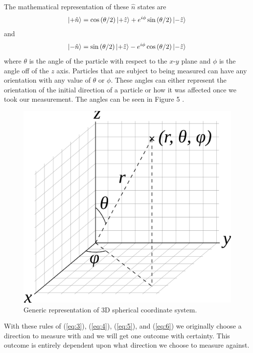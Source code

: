 \documentclass[twocolumn]{article}
\begin{document}
The mathematical representation of these $\hat{n}$ states are 
\begin{equation} \label{eq:5}
\ket{+\hat{n}}=\cos{(\theta/2)}\ket{+\hat{z}}+e^{i\phi}\sin{(\theta/2)}\ket{-\hat{z}}
\end{equation}
and
\begin{equation} \label{eq:6}
\ket{-\hat{n}}=\sin{(\theta/2)}\ket{+\hat{z}}-e^{i\phi}\cos{(\theta/2)}\ket{-\hat{z}}
\end{equation}
where $\theta$ is the angle of the particle with respect to the $x$-$y$ plane and $\phi$ is the angle off of the $z$ axis. Particles that are subject to being measured can have any orientation with any value of $\theta$ or $\phi$. These angles can either represent the orientation of the initial direction of a particle or how it was affected once we took our measurement. The angles can be seen in Figure 5 \cite{Hazewinkel}.
\begin{figure}[htbp]
\begin{center}
\includegraphics[width=0.75\linewidth]{Spherical-Coordinate-System.png}
\caption{Generic representation of 3D spherical coordinate system.}
\end{center}
\end{figure}
\newpage
With these rules of (\ref{eq:3}), (\ref{eq:4}), (\ref{eq:5}), and (\ref{eq:6}) we originally choose a direction to measure with and we will get one outcome with certainty. This outcome is entirely dependent upon what direction we choose to measure against.
\end{document}

